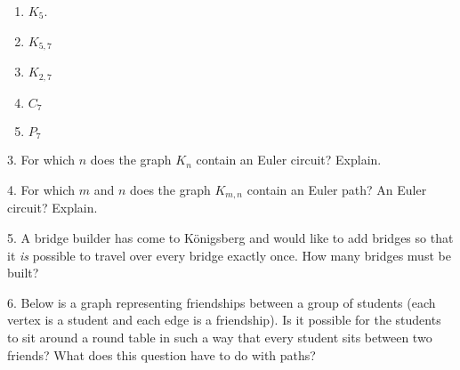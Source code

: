 \documentclass[10pt,]{book}
\theoremstyle{plain}
\theoremstyle{definition}
\theoremstyle{definition}
\theoremstyle{definition}
\numberwithin{equation}{chapter}
\newcommand{\vtx}[2]{node[fill,circle,inner sep=0pt, minimum size=4pt,label=#1:#2]{}}
\renewcommand{\v}{\vtx{above}{}}
\begin{document}
\begin{exerciselist}
\begin{enumerate}[label=(\alph*)]
\item\hypertarget{li-1222}{}\(K_5\).%
\item\hypertarget{li-1223}{}\(K_{5,7}\)%
\item\hypertarget{li-1224}{}\(K_{2,7}\)%
\item\hypertarget{li-1225}{}\(C_7\)%
\item\hypertarget{li-1226}{}\(P_7\)%
\end{enumerate}
\par\smallskip
\item[3.]\hypertarget{exercise-290}{}
For which \(n\) does the graph \(K_n\) contain an Euler circuit? Explain.
%
\par\smallskip
\item[4.]\hypertarget{exercise-291}{}
For which \(m\) and \(n\) does the graph \(K_{m,n}\) contain an Euler path? An Euler circuit? Explain.
%
\par\smallskip
\item[5.]\hypertarget{exercise-292}{}
A bridge builder has come to Königsberg and would like to add bridges so that it \emph{is} possible to travel over every bridge exactly once. How many bridges must be built?
%
\par\smallskip
\item[6.]\hypertarget{exercise-293}{}
Below is a graph representing friendships between a group of students (each vertex is a student and each edge is a friendship). Is it possible for the students to sit around a round table in such a way that every student sits between two friends? What does this question have to do with paths?
%
\leavevmode%
\begin{figure}
\centering
{
}
\end{figure}
\par\smallskip
\end{exerciselist}
\typeout{************************************************}
\typeout{************************************************}
\end{document}
